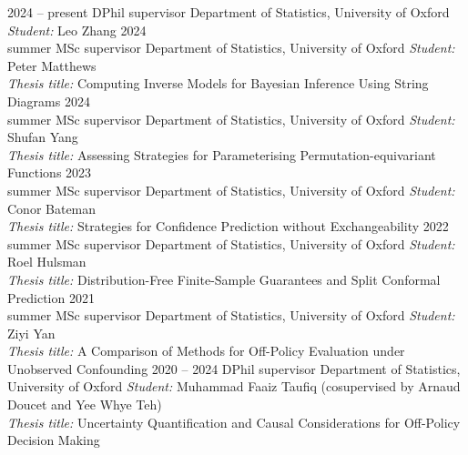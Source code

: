 \documentclass[9pt]{developercv} %
\begin{document}
\vspace{-1em}


\begin{entrylist}
    \entry
        {2024 -- present}
        {DPhil supervisor}
        {Department of Statistics, University of Oxford}
        {\emph{Student:} Leo Zhang}
    \entry
        {2024\\\footnotesize{summer}}
        {MSc supervisor}
        {Department of Statistics, University of Oxford}
        {\emph{Student:} Peter Matthews \\ \emph{Thesis title:} Computing Inverse Models for Bayesian Inference Using String Diagrams}
    \entry
        {2024\\\footnotesize{summer}}
        {MSc supervisor}
        {Department of Statistics, University of Oxford}
        {\emph{Student:} Shufan Yang \\ \emph{Thesis title:} Assessing Strategies for Parameterising Permutation-equivariant Functions}
    \entry
        {2023\\\footnotesize{summer}}
        {MSc supervisor}
        {Department of Statistics, University of Oxford}
        {\emph{Student:} Conor Bateman \\ \emph{Thesis title:} Strategies for Confidence Prediction without Exchangeability}
    \entry
        {2022\\\footnotesize{summer}}
        {MSc supervisor}
        {Department of Statistics, University of Oxford}
        {\emph{Student:} Roel Hulsman \\ \emph{Thesis title:} Distribution-Free Finite-Sample Guarantees and Split Conformal Prediction}
    \entry
        {2021\\\footnotesize{summer}}
        {MSc supervisor}
        {Department of Statistics, University of Oxford}
        {\emph{Student:} Ziyi Yan \\ \emph{Thesis title:} A Comparison of Methods for Off-Policy Evaluation under Unobserved Confounding}
    \entry
        {2020 -- 2024}
        {DPhil supervisor}
        {Department of Statistics, University of Oxford}
        {\emph{Student:} Muhammad Faaiz Taufiq (cosupervised by Arnaud Doucet and Yee Whye Teh) \\
        \emph{Thesis title:} Uncertainty Quantification and Causal Considerations for Off-Policy Decision Making}
\end{entrylist}
\end{document}

